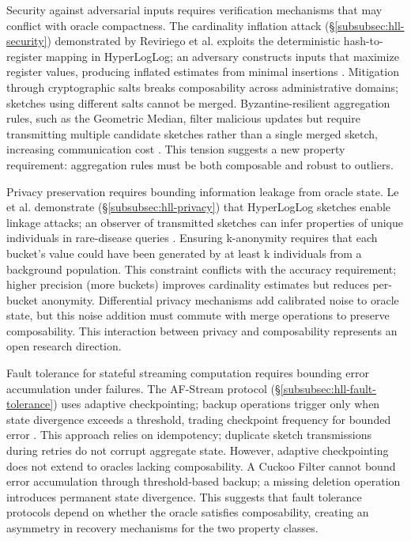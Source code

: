 Security against adversarial inputs requires verification mechanisms that may conflict with oracle compactness. The cardinality inflation attack (\S\ref{subsubsec:hll-security}) demonstrated by Reviriego et al. exploits the deterministic hash-to-register mapping in HyperLogLog; an adversary constructs inputs that maximize register values, producing inflated estimates from minimal insertions \cite{Reviriego2020HyperLogLogS}. Mitigation through cryptographic salts breaks composability across administrative domains; sketches using different salts cannot be merged. Byzantine-resilient aggregation rules, such as the Geometric Median, filter malicious updates but require transmitting multiple candidate sketches rather than a single merged sketch, increasing communication cost \cite{Le2025ByzantineRF, Kuwaranancharoen2023OnTG}. This tension suggests a new property requirement: aggregation rules must be both composable and robust to outliers.

Privacy preservation requires bounding information leakage from oracle state. Le et al. demonstrate (\S\ref{subsubsec:hll-privacy}) that HyperLogLog sketches enable linkage attacks; an observer of transmitted sketches can infer properties of unique individuals in rare-disease queries \cite{Le2025ByzantineRF}. Ensuring k-anonymity requires that each bucket's value could have been generated by at least k individuals from a background population. This constraint conflicts with the accuracy requirement; higher precision (more buckets) improves cardinality estimates but reduces per-bucket anonymity. Differential privacy mechanisms add calibrated noise to oracle state, but this noise addition must commute with merge operations to preserve composability. This interaction between privacy and composability represents an open research direction.

Fault tolerance for stateful streaming computation requires bounding error accumulation under failures. The AF-Stream protocol (\S\ref{subsubsec:hll-fault-tolerance}) uses adaptive checkpointing; backup operations trigger only when state divergence exceeds a threshold, trading checkpoint frequency for bounded error \cite{Huang2016TowardHD}. This approach relies on idempotency; duplicate sketch transmissions during retries do not corrupt aggregate state. However, adaptive checkpointing does not extend to oracles lacking composability. A Cuckoo Filter cannot bound error accumulation through threshold-based backup; a missing deletion operation introduces permanent state divergence. This suggests that fault tolerance protocols depend on whether the oracle satisfies composability, creating an asymmetry in recovery mechanisms for the two property classes.
